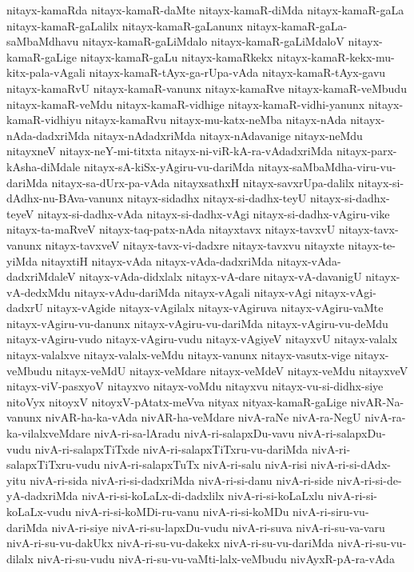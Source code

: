 {nitayx-kamaRda
nitayx-kamaR-daMte
nitayx-kamaR-diMda
nitayx-kamaR-gaLa
nitayx-kamaR-gaLalilx
nitayx-kamaR-gaLanunx
nitayx-kamaR-gaLa-saMbaMdhavu
nitayx-kamaR-gaLiMdalo
nitayx-kamaR-gaLiMdaloV
nitayx-kamaR-gaLige
nitayx-kamaR-gaLu
nitayx-kamaRkekx
nitayx-kamaR-kekx-mu-kitx-pala-vAgali
nitayx-kamaR-tAyx-ga-rUpa-vAda
nitayx-kamaR-tAyx-gavu
nitayx-kamaRvU
nitayx-kamaR-vanunx
nitayx-kamaRve
nitayx-kamaR-veMbudu
nitayx-kamaR-veMdu
nitayx-kamaR-vidhige
nitayx-kamaR-vidhi-yanunx
nitayx-kamaR-vidhiyu
nitayx-kamaRvu
nitayx-mu-katx-neMba
nitayx-nAda
nitayx-nAda-dadxriMda
nitayx-nAdadxriMda
nitayx-nAdavanige
nitayx-neMdu
nitayxneV
nitayx-neY-mi-titxta
nitayx-ni-viR-kA-ra-vAdadxriMda
nitayx-parx-kAsha-diMdale
nitayx-sA-kiSx-yAgiru-vu-dariMda
nitayx-saMbaMdha-viru-vu-dariMda
nitayx-sa-dUrx-pa-vAda
nitayxsathxH
nitayx-savxrUpa-dalilx
nitayx-si-dAdhx-nu-BAva-vanunx
nitayx-sidadhx
nitayx-si-dadhx-teyU
nitayx-si-dadhx-teyeV
nitayx-si-dadhx-vAda
nitayx-si-dadhx-vAgi
nitayx-si-dadhx-vAgiru-vike
nitayx-ta-maRveV
nitayx-taq-patx-nAda
nitayxtavx
nitayx-tavxvU
nitayx-tavx-vanunx
nitayx-tavxveV
nitayx-tavx-vi-dadxre
nitayx-tavxvu
nitayxte
nitayx-te-yiMda
nitayxtiH
nitayx-vAda
nitayx-vAda-dadxriMda
nitayx-vAda-dadxriMdaleV
nitayx-vAda-didxlalx
nitayx-vA-dare
nitayx-vA-davanigU
nitayx-vA-dedxMdu
nitayx-vAdu-dariMda
nitayx-vAgali
nitayx-vAgi
nitayx-vAgi-dadxrU
nitayx-vAgide
nitayx-vAgilalx
nitayx-vAgiruva
nitayx-vAgiru-vaMte
nitayx-vAgiru-vu-danunx
nitayx-vAgiru-vu-dariMda
nitayx-vAgiru-vu-deMdu
nitayx-vAgiru-vudo
nitayx-vAgiru-vudu
nitayx-vAgiyeV
nitayxvU
nitayx-valalx
nitayx-valalxve
nitayx-valalx-veMdu
nitayx-vanunx
nitayx-vasutx-vige
nitayx-veMbudu
nitayx-veMdU
nitayx-veMdare
nitayx-veMdeV
nitayx-veMdu
nitayxveV
nitayx-viV-pasxyoV
nitayxvo
nitayx-voMdu
nitayxvu
nitayx-vu-si-didhx-siye
nitoVyx
nitoyxV
nitoyxV-pAtatx-meVva
nityax
nityax-kamaR-gaLige
nivAR-Na-vanunx
nivAR-ha-ka-vAda
nivAR-ha-veMdare
nivA-raNe
nivA-ra-NegU
nivA-ra-ka-vilalxveMdare
nivA-ri-sa-lAradu
nivA-ri-salapxDu-vavu
nivA-ri-salapxDu-vudu
nivA-ri-salapxTiTxde
nivA-ri-salapxTiTxru-vu-dariMda
nivA-ri-salapxTiTxru-vudu
nivA-ri-salapxTuTx
nivA-ri-salu
nivA-risi
nivA-ri-si-dAdx-yitu
nivA-ri-sida
nivA-ri-si-dadxriMda
nivA-ri-si-danu
nivA-ri-side
nivA-ri-si-de-yA-dadxriMda
nivA-ri-si-koLaLx-di-dadxlilx
nivA-ri-si-koLaLxlu
nivA-ri-si-koLaLx-vudu
nivA-ri-si-koMDi-ru-vanu
nivA-ri-si-koMDu
nivA-ri-siru-vu-dariMda
nivA-ri-siye
nivA-ri-su-lapxDu-vudu
nivA-ri-suva
nivA-ri-su-va-varu
nivA-ri-su-vu-dakUkx
nivA-ri-su-vu-dakekx
nivA-ri-su-vu-dariMda
nivA-ri-su-vu-dilalx
nivA-ri-su-vudu
nivA-ri-su-vu-vaMti-lalx-veMbudu
nivAyxR-pA-ra-vAda
}
